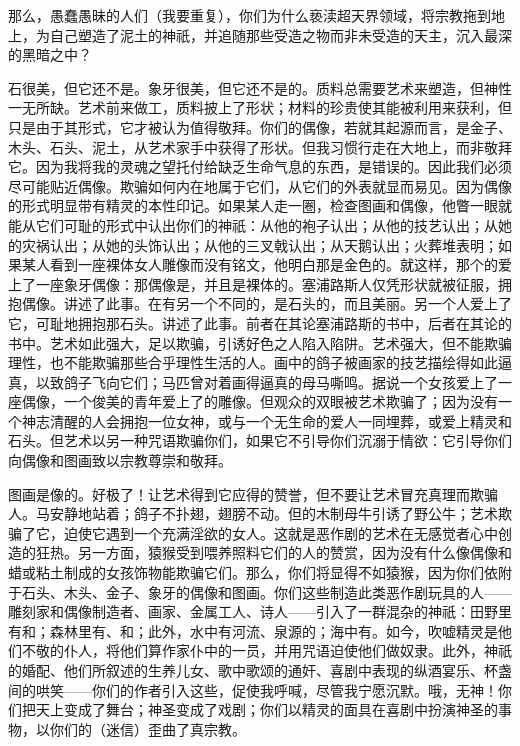那么，愚蠢愚昧的人们（我要重复），你们为什么亵渎超天界领域，将宗教拖到地上，为自己塑造了泥土的神祇，并追随那些受造之物而非未受造的天主，沉入最深的黑暗之中？\par

石很美，但它还不是。象牙很美，但它还不是的。质料总需要艺术来塑造，但神性一无所缺。艺术前来做工，质料披上了形状；材料的珍贵使其能被利用来获利，但只是由于其形式，它才被认为值得敬拜。你们的偶像，若就其起源而言，是金子、木头、石头、泥土，从艺术家手中获得了形状。但我习惯行走在大地上，而非敬拜它。因为我将我的灵魂之望托付给缺乏生命气息的东西，是错误的。因此我们必须尽可能贴近偶像。欺骗如何内在地属于它们，从它们的外表就显而易见。因为偶像的形式明显带有精灵的本性印记。如果某人走一圈，检查图画和偶像，他瞥一眼就能从它们可耻的形式中认出你们的神祇：从他的袍子认出；从他的技艺认出；从她的灾祸认出；从她的头饰认出；从他的三叉戟认出；从天鹅认出；火葬堆表明；如果某人看到一座裸体女人雕像而没有铭文，他明白那是金色的。就这样，那个的爱上了一座象牙偶像：那偶像是，并且是裸体的。塞浦路斯人仅凭形状就被征服，拥抱偶像。讲述了此事。在有另一个不同的，是石头的，而且美丽。另一个人爱上了它，可耻地拥抱那石头。讲述了此事。前者在其论塞浦路斯的书中，后者在其论的书中。艺术如此强大，足以欺骗，引诱好色之人陷入陷阱。艺术强大，但不能欺骗理性，也不能欺骗那些合乎理性生活的人。画中的鸽子被画家的技艺描绘得如此逼真，以致鸽子飞向它们；马匹曾对着画得逼真的母马嘶鸣。据说一个女孩爱上了一座偶像，一个俊美的青年爱上了的雕像。但观众的双眼被艺术欺骗了；因为没有一个神志清醒的人会拥抱一位女神，或与一个无生命的爱人一同埋葬，或爱上精灵和石头。但艺术以另一种咒语欺骗你们，如果它不引导你们沉溺于情欲：它引导你们向偶像和图画致以宗教尊崇和敬拜。\par

图画是像的。好极了！让艺术得到它应得的赞誉，但不要让艺术冒充真理而欺骗人。马安静地站着；鸽子不扑翅，翅膀不动。但的木制母牛引诱了野公牛；艺术欺骗了它，迫使它遇到一个充满淫欲的女人。这就是恶作剧的艺术在无感觉者心中创造的狂热。另一方面，猿猴受到喂养照料它们的人的赞赏，因为没有什么像偶像和蜡或粘土制成的女孩饰物能欺骗它们。那么，你们将显得不如猿猴，因为你们依附于石头、木头、金子、象牙的偶像和图画。你们这些制造此类恶作剧玩具的人——雕刻家和偶像制造者、画家、金属工人、诗人——引入了一群混杂的神祇：田野里有和；森林里有、和；此外，水中有河流、泉源的；海中有。如今，吹嘘精灵是他们不敬的仆人，将他们算作家仆中的一员，并用咒语迫使他们做奴隶。此外，神祇的婚配、他们所叙述的生养儿女、歌中歌颂的通奸、喜剧中表现的纵酒宴乐、杯盏间的哄笑——你们的作者引入这些，促使我呼喊，尽管我宁愿沉默。哦，无神！你们把天上变成了舞台；神圣变成了戏剧；你们以精灵的面具在喜剧中扮演神圣的事物，以你们的（迷信）歪曲了真宗教。\par

